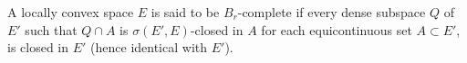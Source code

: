A locally convex space $E$ is said to be $B_r$-complete if every dense subspace $Q$ of $E'$ such that $Q \cap A$ is $\sigma(E', E)$-closed in $A$ for each equicontinuous set $A \subset E'$, is closed in $E'$ (hence identical with $E'$).
